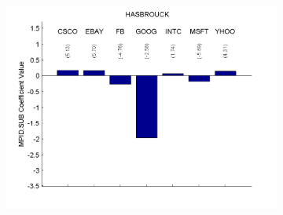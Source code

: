 \documentclass{article}
\begin{document}
\begin{figure}[htp!]
\begin{subfigure}{0.31\textwidth}
\includegraphics[width=\linewidth]{docs/TMBR_Regression_Ratio_30sec_26_MPID_SUB_1MPIDLags_5DepVarLags.pdf}
\end{subfigure}

\begin{minipage}{\textwidth}
\footnotesize
\end{minipage}
\end{figure}
\end{document}
